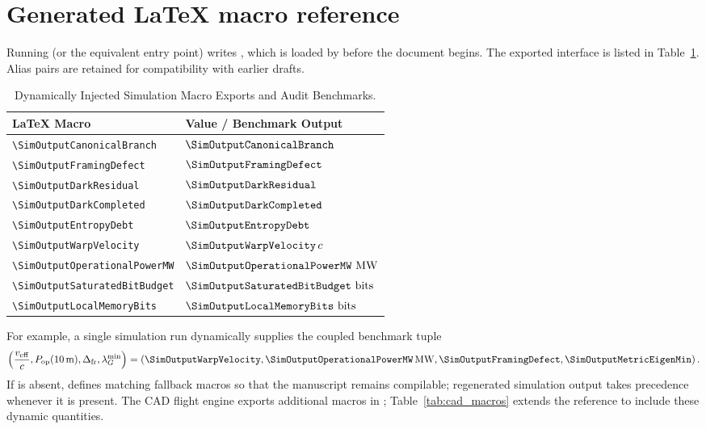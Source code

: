 \appendix
\section{Generated LaTeX macro reference}\label{app:macro-reference}

Running  (or the equivalent 
entry point) writes , which is loaded by 
before the document begins.  The exported interface is listed in
Table~\ref{tab:sim_macros}.  Alias pairs are retained for compatibility with
earlier drafts.

\begin{table}[htbp]
\centering
\caption{Dynamically Injected Simulation Macro Exports and Audit Benchmarks.}
\label{tab:sim_macros}
\begin{tabular}{ll}
\toprule
\textbf{LaTeX Macro} & \textbf{Value / Benchmark Output} \\
\midrule
\texttt{\textbackslash SimOutputCanonicalBranch} & $\SimOutputCanonicalBranch$ \\
\texttt{\textbackslash SimOutputFramingDefect} & $\SimOutputFramingDefect$ \\
\texttt{\textbackslash SimOutputDarkResidual} & $\SimOutputDarkResidual$ \\
\texttt{\textbackslash SimOutputDarkCompleted} & $\SimOutputDarkCompleted$ \\
\texttt{\textbackslash SimOutputEntropyDebt} & $\SimOutputEntropyDebt$ \\
\texttt{\textbackslash SimOutputWarpVelocity} & $\SimOutputWarpVelocity\,c$ \\
\texttt{\textbackslash SimOutputOperationalPowerMW} & $\SimOutputOperationalPowerMW\ \text{MW}$ \\
\texttt{\textbackslash SimOutputSaturatedBitBudget} & $\SimOutputSaturatedBitBudget\ \text{bits}$ \\
\texttt{\textbackslash SimOutputLocalMemoryBits} & $\SimOutputLocalMemoryBits\ \text{bits}$ \\
\bottomrule
\end{tabular}
\end{table}

For example, a single simulation run dynamically supplies the coupled
benchmark tuple
\begin{equation}
  \left(
    \frac{v_{\mathrm{eff}}}{c},
    P_{\mathrm{op}}(10\,\mathrm{m}),
    \Delta_{\mathrm{fr}},
    \lambda_G^{\min}
  \right)
  =\left(
    \SimOutputWarpVelocity,
    \SimOutputOperationalPowerMW\,\mathrm{MW},
    \SimOutputFramingDefect,
    \SimOutputMetricEigenMin
  \right).
  \label{eq:dynamic-macro-example}
\end{equation}
If  is absent,  defines matching fallback
macros so that the manuscript remains compilable; regenerated simulation
output takes precedence whenever it is present.  The CAD flight engine exports
additional macros in ; Table~\ref{tab:cad_macros}
extends the reference to include these dynamic quantities.

